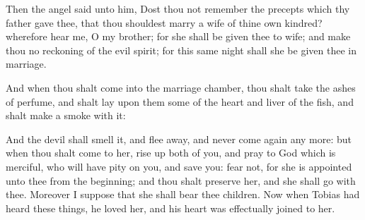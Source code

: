 {\par }{\PP {}Then the angel said unto him, Dost thou not remember the precepts which thy father gave thee, that thou shouldest marry a wife of thine own kindred? wherefore hear me, O my brother; for she shall be given thee to wife; and make thou no reckoning of the evil spirit; for this same night shall she be given thee in marriage.
\par }{\PP {}And when thou shalt come into the marriage chamber, thou shalt take the ashes of perfume, and shalt lay upon them some of the heart and liver of the fish, and shalt make a smoke with it:
\par }{\PP {}And the devil shall smell it, and flee away, and never come again any more: but when thou shalt come to her, rise up both of you, and pray to God which is merciful, who will have pity on you, and save you: fear not, for she is appointed unto thee from the beginning; and thou shalt preserve her, and she shall go with thee. Moreover I suppose that she shall bear thee children. Now when Tobias had heard these things, he loved her, and his heart was effectually joined to her.

}
